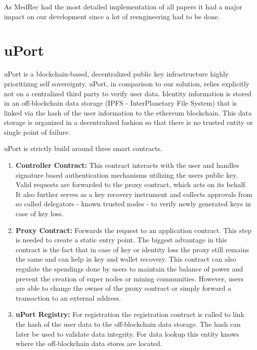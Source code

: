 As MedRec had the most detailed implementation of all papers it had a major impact on our development since
a lot of reengineering had to be done.

\section{uPort}
uPort is a blockchain-based, decentralized public key infrastructure highly prioritizing self sovereignty. uPort, in comparison to our solution, relies explicitly not on a centralized third party to verify user data.\cite[p. 2]{uPortWhitePaper}
Identity information is stored in an off-blockchain data storage (IPFS - InterPlanetary File System) that is linked via the hash of the user information to the ethereum blockchain. This data storage is organized in a decentralized fashion so that there is no trusted entity or single point of failure. 

\noindent uPort is strictly build around three smart contracts.
\begin{enumerate}
\item \textbf{Controller Contract:} This contract interacts with the user and handles signature based authentication mechanisms utilizing the users public key. Valid requests are forwarded to the proxy contract, which acts on its behalf. 
It also further serves as a key recovery instrument and collects approvals from so called delegators - known trusted nodes - to verify newly generated keys in case of key loss.

\item \textbf{Proxy Contract:}
Forwards the request to an application contract. This step is needed to create a static entry point.
The biggest advantage in this contract is the fact that in case of key or identity loss the proxy still remains the same and can help in key and wallet recovery.
This contract can also regulate the spendings done by users to maintain the balance of power and prevent the creation of super nodes or mining communities.
However, users are able to change the owner of the proxy contract or simply forward a transaction to an external address\cite[p. 6]{uPortWhitePaper}.

\item \textbf{uPort Registry:}
For registration the registration contract is called to link the hash of the user data to the off-blockchain data storage. The hash can later be used to validate data integrity. 
For data lookup this entity knows where the off-blockchain data stores are located.

\end{enumerate}

